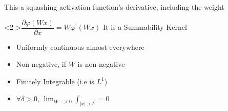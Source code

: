 \documentclass[dvipsnames,handout]{beamer}
\renewcommand{\v}{\varphi}
\newcommand{\vp}{\v^\prime}
\begin{document}
\begin{frame}{This a squashing activation function's derivative, including the weight}
	\begin{block}<2->{$\dfrac{\partial\v(Wx)}{\partial x}=W\vp(Wx)$ \hfill It is a Summability Kernel}
		\begin{itemize}
			\item Uniformly continuous almost everywhere
			\item Non-negative, if $W$ is non-negative
			\item Finitely Integrable (i.e is $L^1$)
			\item $\forall \delta>0$, $\displaystyle\lim_{W->0} \int_{|x|>\delta} = 0$
		\end{itemize}
		
	\end{block}
	
	
	\begin{columns}[onlytextwidth]
		\begin{column}{0.33\textwidth}
			\centering
		\end{column}
		
		
		\begin{column}{0.33\textwidth}
			\centering
		\end{column}
		
		
		\begin{column}{0.33\textwidth}
			\centering
		\end{column}	
	\end{columns}
\end{frame}
\end{document}
